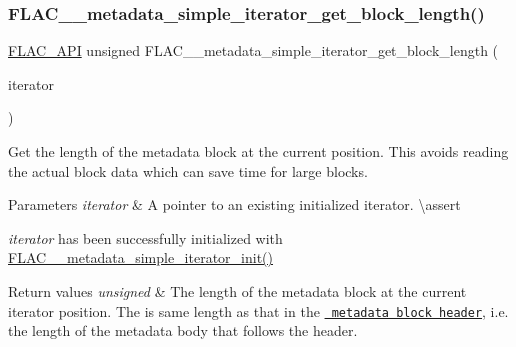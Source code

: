 \subsubsection{\texorpdfstring{FLAC\_\_metadata\_simple\_iterator\_get\_block\_length()}{FLAC\_\_metadata\_simple\_iterator\_get\_block\_length()}}
{\footnotesize\ttfamily \mbox{\hyperlink{group__flac__export_ga56ca07df8a23310707732b1c0007d6f5}{F\+L\+A\+C\+\_\+\+A\+PI}} unsigned F\+L\+A\+C\+\_\+\+\_\+metadata\+\_\+simple\+\_\+iterator\+\_\+get\+\_\+block\+\_\+length (\begin{DoxyParamCaption}\item[{const \mbox{\hyperlink{group__flac__metadata__level1_ga6accccddbb867dfc2eece9ee3ffecb3a}{F\+L\+A\+C\+\_\+\+\_\+\+Metadata\+\_\+\+Simple\+Iterator}} $\ast$}]{iterator }\end{DoxyParamCaption})}

Get the length of the metadata block at the current position. This avoids reading the actual block data which can save time for large blocks.


\begin{DoxyParams}{Parameters}
{\em iterator} & A pointer to an existing initialized iterator. \textbackslash{}assert 
\begin{DoxyCode}{1}
\end{DoxyCode}
 {\itshape iterator} has been successfully initialized with \mbox{\hyperlink{group__flac__metadata__level1_ga2a055cca4e6e06ae62517c8b0fa6e8a3}{F\+L\+A\+C\+\_\+\+\_\+metadata\+\_\+simple\+\_\+iterator\+\_\+init()}} \\
\hline
\end{DoxyParams}

\begin{DoxyRetVals}{Return values}
{\em unsigned} & The length of the metadata block at the current iterator position. The is same length as that in the \href{http://xiph.org/flac/format.html\#metadata_block_header}{\texttt{ metadata block header}}, i.\+e. the length of the metadata body that follows the header. \\
\hline
\end{DoxyRetVals}
\mbox{\label{group__flac__metadata__level1_ga46e158a3f70c0e39db9c68a9ff9a2621}} 
